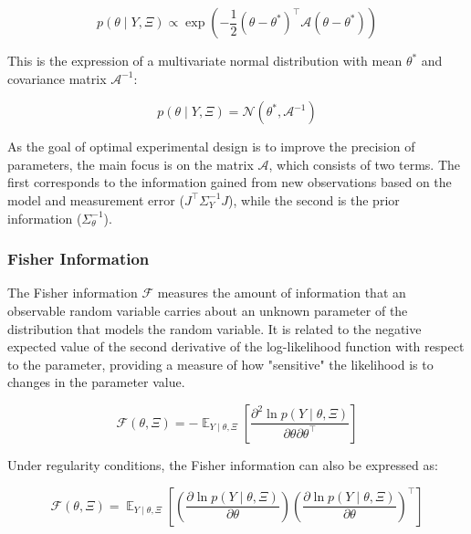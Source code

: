 \documentclass[a4paper,fleqn]{cas-dc}
\begin{document}
		{\footnotesize \begin{equation} p\left(\theta \mid Y, \Xi \right) \propto \exp \left( -\frac{1}{2} \left( \theta - \theta^* \right)^\top \mathcal{A} \left( \theta - \theta^* \right) \right) \end{equation} }
		
		This is the expression of a multivariate normal distribution with mean $\theta^*$ and covariance matrix $\mathcal{A}^{-1}$:
		
		{\footnotesize \begin{equation} p\left(\theta \mid Y, \Xi \right) = \mathcal{N}\left( \theta^*, \mathcal{A}^{-1} \right) \end{equation} }
		
		As the goal of optimal experimental design is to improve the precision of parameters, the main focus is on the matrix $\mathcal{A}$, which consists of two terms. The first corresponds to the information gained from new observations based on the model and measurement error ($J^\top \Sigma_Y^{-1} J$), while the second is the prior information ($\Sigma_\theta^{-1}$).
		
		\subsubsection{Fisher Information}
		
		The Fisher information $\mathcal{F}$ measures the amount of information that an observable random variable carries about an unknown parameter of the distribution that models the random variable. It is related to the negative expected value of the second derivative of the log-likelihood function with respect to the parameter, providing a measure of how "sensitive" the likelihood is to changes in the parameter value.
		
		{\footnotesize \begin{equation} \mathcal{F}(\theta, \Xi) = -\mathop{\mathbb{E}}_{Y \mid \theta, \Xi} \left[ \frac{\partial^2 \ln p \left( Y \mid \theta, \Xi \right)}{\partial \theta \partial \theta^\top} \right] \end{equation} }
		
		Under regularity conditions, the Fisher information can also be expressed as:
		
		{\footnotesize \begin{equation} \mathcal{F}(\theta, \Xi) = \mathop{\mathbb{E}}_{Y \mid \theta, \Xi} \left[ \left( \frac{\partial \ln p\left( Y \mid \theta, \Xi \right)}{\partial \theta} \right) \left( \frac{\partial \ln p\left( Y \mid \theta, \Xi \right)}{\partial \theta} \right)^\top \right] \end{equation} }
		
\end{document}
